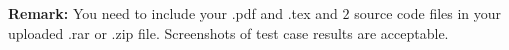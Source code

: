 \documentclass[12pt,a4paper]{article}
\theoremstyle{definition}
\begin{document}
	\vspace{20pt}
	
	\textbf{Remark:} You need to include your .pdf and .tex and {\color{red}\emph{$2$}} source code files in your uploaded .rar or .zip file. Screenshots of test case results are acceptable.
	
\end{document}
